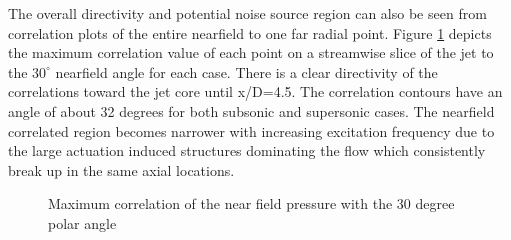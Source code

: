 \documentclass[english]{aiaa-tc}
\begin{document}
The overall directivity and potential noise source region can also be seen from correlation plots of the entire nearfield to one far radial point. Figure \ref{maxCorrel} depicts the maximum correlation value of each point on a streamwise slice of the jet to the $30^{\circ}$ nearfield angle for each case. There is a clear directivity of the correlations toward the jet core until x/D=4.5. The correlation contours have an angle of about 32 degrees for both subsonic and supersonic cases. The nearfield correlated region becomes narrower with increasing excitation frequency due to the large actuation induced structures dominating the flow which consistently break up in the same axial locations.
\begin{figure} 
\begin{centering}

\end{centering}
\caption{Maximum correlation of the near field pressure with the 30 degree polar angle}\label{maxCorrel}
\end{figure}
\end{document}
